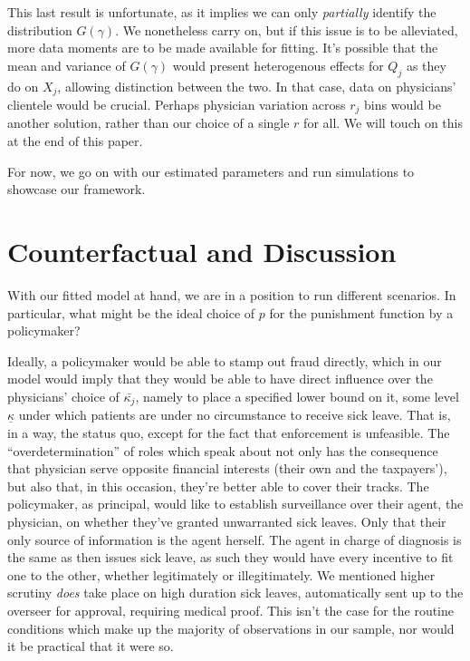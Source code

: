 \documentclass[../main.tex]{subfiles}
\begin{document}
This last result is unfortunate, as it implies we can only \textit{partially} identify the distribution $G(\gamma)$. We nonetheless carry on, but if this issue is to be alleviated, more data moments are to be made available for fitting. It's possible that the mean and variance of $G(\gamma)$ would present heterogenous effects for $Q_j$ as they do on $X_j$, allowing distinction between the two. In that case, data on physicians' clientele would be crucial. Perhaps physician variation across $r_j$ bins would be another solution, rather than our choice of a single $r$ for all. We will touch on this at the end of this paper.

For now, we go on with our estimated parameters and run simulations to showcase our framework.


\section{Counterfactual and Discussion}

With our fitted model at hand, we are in a position to run different scenarios. In particular, what might be the ideal choice of $p$ for the punishment function by a policymaker?

Ideally, a policymaker would be able to stamp out fraud directly, which in our model would imply that they would be able to have direct influence over the physicians' choice of $\bar{\kappa_j}$, namely to place a specified lower bound on it, some level $\underline{\kappa}$ under which patients are under no circumstance to receive sick leave. That is, in a way, the status quo, except for the fact that enforcement is unfeasible. The ``overdetermination'' of roles which \cite{markussen-roed} speak about not only has the consequence that physician serve opposite financial interests (their own and the taxpayers'), but also that, in this occasion, they're better able to cover their tracks. The policymaker, as principal, would like to establish surveillance over their agent, the physician, on whether they've granted unwarranted sick leaves. Only that their only source of information is the agent herself. The agent in charge of diagnosis is the same as then issues sick leave, as such they would have every incentive to fit one to the other, whether legitimately or illegitimately. We mentioned higher scrutiny \textit{does} take place on high duration sick leaves, automatically sent up to the overseer for approval, requiring medical proof. This isn't the case for the routine conditions which make up the majority of observations in our sample, nor would it be practical that it were so.
\end{document}
